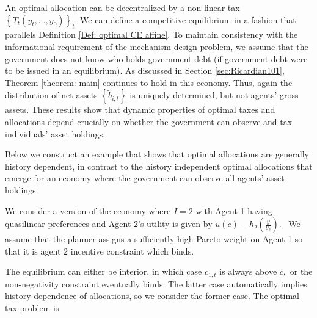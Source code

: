 \documentclass[thmsb,11pt]{article}
\begin{document}
{An optimal allocation can be decentralized by a non-linear tax $\left \{
T_{t}\left( y_{t},...,y_{0}\right) \right \} _{t}.$ We can define a
competitive equilibrium in a fashion that parallels Definition \ref{Def:
optimal CE affine}. To maintain consistency with the informational
requirement of the mechanism design problem, we assume that the government
does not know who holds government debt (if government debt were to be
issued in an equilibrium).  As discussed in Section \ref{sec:Ricardian101},  Theorem \ref{theorem: main} continues to hold in this economy. Thus, again
the distribution of net assets $\left \{ \tilde{b}_{i,t}\right \} $ is
uniquely determined, but not agents' gross assets. These results show that
dynamic properties of optimal taxes and allocations depend crucially on
whether the government can observe and tax individuals' asset holdings.

Below we construct an example that shows that optimal allocations
are generally history dependent, in contrast to the history independent
optimal allocations that emerge for an economy where the government can
observe all agents' asset holdings.

We consider a version of the  economy where $I=2$  with Agent 1 having quasilinear preferences and Agent 2's utility is given by $%
u(c)-h_{2}\left( \frac{y}{\theta _{2}}\right) .$ \ We assume that the
planner assigns a sufficiently high Pareto weight on Agent 1 so that it is
agent 2 incentive constraint which binds.

The equilibrium can either be interior,
in which case $c_{1,t}$ is always above $\underline{c},$ or the non-negativity constraint eventually binds. The latter case automatically implies
history-dependence of allocations, so we consider the former case. The
optimal tax problem is

}
\end{document}

